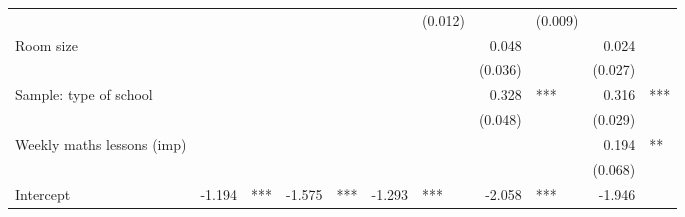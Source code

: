 \documentclass{article}
\begin{document}
\begin{table}[!h]
\begin{tabular}{lllllllllll}
  \multicolumn{1}{r}{} &
  \multicolumn{1}{l}{} &
  \multicolumn{1}{r}{} &
  \multicolumn{1}{l}{} &
  \multicolumn{1}{r}{} &
  \multicolumn{1}{l}{} &
  \multicolumn{1}{r}{(0.012)} &
  \multicolumn{1}{l}{} &
  \multicolumn{1}{r}{(0.009)} &
  \multicolumn{1}{l}{} \\
\multicolumn{1}{l}{Room size} &
  \multicolumn{1}{r}{} &
  \multicolumn{1}{l}{} &
  \multicolumn{1}{r}{} &
  \multicolumn{1}{l}{} &
  \multicolumn{1}{r}{} &
  \multicolumn{1}{l}{} &
  \multicolumn{1}{r}{0.048} &
  \multicolumn{1}{l}{} &
  \multicolumn{1}{r}{0.024} &
  \multicolumn{1}{l}{} \\
\multicolumn{1}{l}{} &
  \multicolumn{1}{r}{} &
  \multicolumn{1}{l}{} &
  \multicolumn{1}{r}{} &
  \multicolumn{1}{l}{} &
  \multicolumn{1}{r}{} &
  \multicolumn{1}{l}{} &
  \multicolumn{1}{r}{(0.036)} &
  \multicolumn{1}{l}{} &
  \multicolumn{1}{r}{(0.027)} &
  \multicolumn{1}{l}{} \\
\multicolumn{1}{l}{Sample: type of school} &
  \multicolumn{1}{r}{} &
  \multicolumn{1}{l}{} &
  \multicolumn{1}{r}{} &
  \multicolumn{1}{l}{} &
  \multicolumn{1}{r}{} &
  \multicolumn{1}{l}{} &
  \multicolumn{1}{r}{0.328} &
  \multicolumn{1}{l}{***} &
  \multicolumn{1}{r}{0.316} &
  \multicolumn{1}{l}{***} \\
\multicolumn{1}{l}{} &
  \multicolumn{1}{r}{} &
  \multicolumn{1}{l}{} &
  \multicolumn{1}{r}{} &
  \multicolumn{1}{l}{} &
  \multicolumn{1}{r}{} &
  \multicolumn{1}{l}{} &
  \multicolumn{1}{r}{(0.048)} &
  \multicolumn{1}{l}{} &
  \multicolumn{1}{r}{(0.029)} &
  \multicolumn{1}{l}{} \\
\multicolumn{1}{l}{Weekly maths lessons (imp)} &
  \multicolumn{1}{r}{} &
  \multicolumn{1}{l}{} &
  \multicolumn{1}{r}{} &
  \multicolumn{1}{l}{} &
  \multicolumn{1}{r}{} &
  \multicolumn{1}{l}{} &
  \multicolumn{1}{r}{} &
  \multicolumn{1}{l}{} &
  \multicolumn{1}{r}{0.194} &
  \multicolumn{1}{l}{**} \\
\multicolumn{1}{l}{} &
  \multicolumn{1}{r}{} &
  \multicolumn{1}{l}{} &
  \multicolumn{1}{r}{} &
  \multicolumn{1}{l}{} &
  \multicolumn{1}{r}{} &
  \multicolumn{1}{l}{} &
  \multicolumn{1}{r}{} &
  \multicolumn{1}{l}{} &
  \multicolumn{1}{r}{(0.068)} &
  \multicolumn{1}{l}{} \\
\multicolumn{1}{l}{Intercept} &
  \multicolumn{1}{r}{-1.194} &
  \multicolumn{1}{l}{***} &
  \multicolumn{1}{r}{-1.575} &
  \multicolumn{1}{l}{***} &
  \multicolumn{1}{r}{-1.293} &
  \multicolumn{1}{l}{***} &
  \multicolumn{1}{r}{-2.058} &
  \multicolumn{1}{l}{***} &
  \multicolumn{1}{r}{-1.946} &

\end{tabular}
\end{table}
\end{document}
